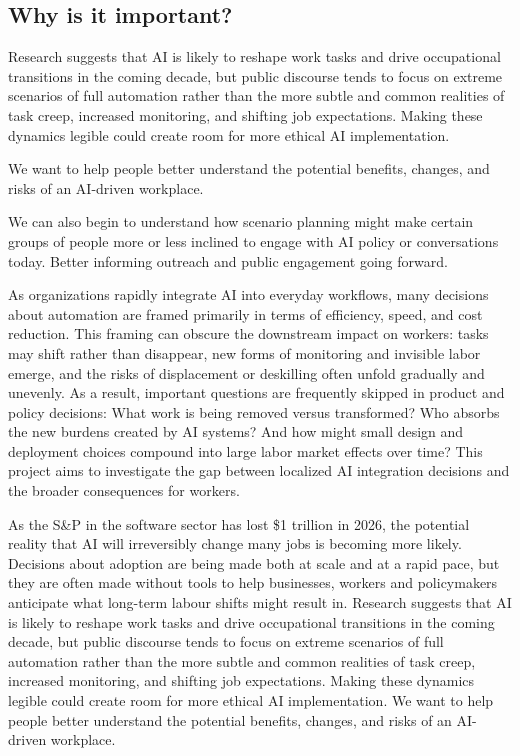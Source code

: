 \documentclass[sigconf,authordraft]{acmart}
\begin{document}
\subsection{Why is it important?}

Research suggests that AI is likely to reshape work tasks and drive occupational transitions in the coming decade, but public discourse tends to focus on extreme scenarios of full automation rather than the more subtle and common realities of task creep, increased monitoring, and shifting job expectations. Making these dynamics legible could create room for more ethical AI implementation. 

We want to help people better understand the potential benefits, changes, and risks of an AI-driven workplace.

We can also begin to understand how scenario planning might make certain groups of people more or less inclined to engage with AI policy or conversations today. Better informing outreach and public engagement going forward. 

As organizations rapidly integrate AI into everyday workflows, many decisions about automation are framed primarily in terms of efficiency, speed, and cost reduction. This framing can obscure the downstream impact on workers: tasks may shift rather than disappear, new forms of monitoring and invisible labor emerge, and the risks of displacement or deskilling often unfold gradually and unevenly. As a result, important questions are frequently skipped in product and policy decisions: What work is being removed versus transformed? Who absorbs the new burdens created by AI systems? And how might small design and deployment choices compound into large labor market effects over time? This project aims to investigate the gap between localized AI integration decisions and the broader consequences for workers.

As the S\&P in the software sector has lost \$1 trillion in 2026, the potential reality that AI will irreversibly change many jobs is becoming more likely. Decisions about adoption are being made both at scale and at a rapid pace, but they are often made without tools to help businesses, workers and policymakers anticipate what long-term labour shifts might result in. Research suggests that AI is likely to reshape work tasks and drive occupational transitions in the coming decade, but public discourse tends to focus on extreme scenarios of full automation rather than the more subtle and common realities of task creep, increased monitoring, and shifting job expectations. Making these dynamics legible could create room for more ethical AI implementation. We want to help people better understand the potential benefits, changes, and risks of an AI-driven workplace.
\end{document}
